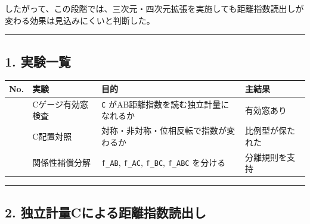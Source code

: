 \documentclass[
]{article}
\newcounter{none} %
\begin{document}
したがって、この段階では、三次元・四次元拡張を実施しても距離指数読出しが変わる効果は見込みにくいと判断した。

\begin{center}\rule{0.5\linewidth}{0.5pt}\end{center}

\subsection{1. 実験一覧}\label{ux5b9fux9a13ux4e00ux89a7}

{\def\LTcaptype{none} %
\begin{longtable}[]{@{}
  >{\raggedleft\arraybackslash}p{}
  >{\raggedright\arraybackslash}p{}
  >{\raggedright\arraybackslash}p{}
  >{\raggedright\arraybackslash}p{}@{}}
\toprule\noalign{}
\begin{minipage}[b]{\linewidth}\raggedleft
No.
\end{minipage} & \begin{minipage}[b]{\linewidth}\raggedright
実験
\end{minipage} & \begin{minipage}[b]{\linewidth}\raggedright
目的
\end{minipage} & \begin{minipage}[b]{\linewidth}\raggedright
主結果
\end{minipage} \\
\midrule\noalign{}
\endhead
\bottomrule\noalign{}
\endlastfoot
1 & Cゲージ有効窓検査 & \texttt{C} がAB距離指数を読む独立計量になれるか
& 有効窓あり \\
2 & C配置対照 & 対称・非対称・位相反転で指数が変わるか &
比例型が保たれた \\
3 & 関係性補償分解 & \texttt{f\_AB}, \texttt{f\_AC}, \texttt{f\_BC},
\texttt{f\_ABC} を分ける & 分離規則を支持 \\
\end{longtable}
}

\begin{center}\rule{0.5\linewidth}{0.5pt}\end{center}

\subsection{2.
独立計量Cによる距離指数読出し}\label{ux72ecux7acbux8a08ux91cfcux306bux3088ux308bux8dddux96e2ux6307ux6570ux8aadux51faux3057}
\end{document}
